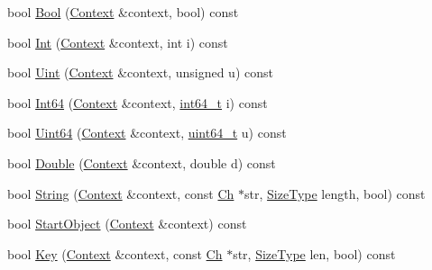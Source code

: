\begin{DoxyCompactItemize}
bool \mbox{\hyperlink{classrapidjson_1_1internal_1_1_schema_a6ebaf1a26034d6d2a013f724a4499647}{Bool}} (\mbox{\hyperlink{classrapidjson_1_1internal_1_1_schema_afca06b1f51d1bc18403bdf3f4d55ffef}{Context}} \&context, bool) const
\item 
bool \mbox{\hyperlink{classrapidjson_1_1internal_1_1_schema_af2da329dec8daa430f8ff4b146cacbd9}{Int}} (\mbox{\hyperlink{classrapidjson_1_1internal_1_1_schema_afca06b1f51d1bc18403bdf3f4d55ffef}{Context}} \&context, int i) const
\item 
bool \mbox{\hyperlink{classrapidjson_1_1internal_1_1_schema_a73ea9005ea8794f4187b2cb943903471}{Uint}} (\mbox{\hyperlink{classrapidjson_1_1internal_1_1_schema_afca06b1f51d1bc18403bdf3f4d55ffef}{Context}} \&context, unsigned u) const
\item 
bool \mbox{\hyperlink{classrapidjson_1_1internal_1_1_schema_a62e40cebd07d99919b7a2e6fb97d2112}{Int64}} (\mbox{\hyperlink{classrapidjson_1_1internal_1_1_schema_afca06b1f51d1bc18403bdf3f4d55ffef}{Context}} \&context, \mbox{\hyperlink{stdint_8h_a414156feea104f8f75b4ed9e3121b2f6}{int64\+\_\+t}} i) const
\item 
bool \mbox{\hyperlink{classrapidjson_1_1internal_1_1_schema_a0dbf7bd40c28def6988d5e35f61f17a7}{Uint64}} (\mbox{\hyperlink{classrapidjson_1_1internal_1_1_schema_afca06b1f51d1bc18403bdf3f4d55ffef}{Context}} \&context, \mbox{\hyperlink{stdint_8h_aec6fcb673ff035718c238c8c9d544c47}{uint64\+\_\+t}} u) const
\item 
bool \mbox{\hyperlink{classrapidjson_1_1internal_1_1_schema_ab8bb661d6783c016e03606493c859358}{Double}} (\mbox{\hyperlink{classrapidjson_1_1internal_1_1_schema_afca06b1f51d1bc18403bdf3f4d55ffef}{Context}} \&context, double d) const
\item 
bool \mbox{\hyperlink{classrapidjson_1_1internal_1_1_schema_a221dfa37eb3fb9b93c3428f3508ec0c4}{String}} (\mbox{\hyperlink{classrapidjson_1_1internal_1_1_schema_afca06b1f51d1bc18403bdf3f4d55ffef}{Context}} \&context, const \mbox{\hyperlink{classrapidjson_1_1internal_1_1_schema_ab9093cbc42067b8e1d3745eafe096ab3}{Ch}} $\ast$str, \mbox{\hyperlink{namespacerapidjson_a44eb33eaa523e36d466b1ced64b85c84}{Size\+Type}} length, bool) const
\item 
bool \mbox{\hyperlink{classrapidjson_1_1internal_1_1_schema_a64fd79498ff9e034dae8180f1f0701ce}{Start\+Object}} (\mbox{\hyperlink{classrapidjson_1_1internal_1_1_schema_afca06b1f51d1bc18403bdf3f4d55ffef}{Context}} \&context) const
\item 
bool \mbox{\hyperlink{classrapidjson_1_1internal_1_1_schema_a815c23a7b366bfb92b07574423c045c1}{Key}} (\mbox{\hyperlink{classrapidjson_1_1internal_1_1_schema_afca06b1f51d1bc18403bdf3f4d55ffef}{Context}} \&context, const \mbox{\hyperlink{classrapidjson_1_1internal_1_1_schema_ab9093cbc42067b8e1d3745eafe096ab3}{Ch}} $\ast$str, \mbox{\hyperlink{namespacerapidjson_a44eb33eaa523e36d466b1ced64b85c84}{Size\+Type}} len, bool) const

\end{DoxyCompactItemize}
